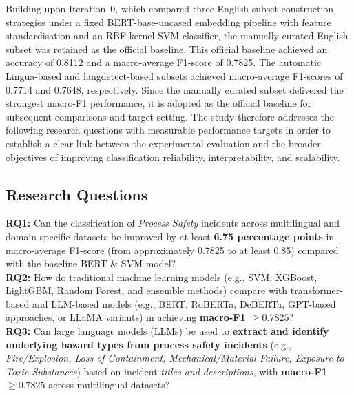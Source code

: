 \documentclass[11pt, titlepage, bibliography=totoc]{scrreprt}
\begin{document}
Building upon Iteration~0, which compared three English subset construction strategies under a fixed BERT-base-uncased embedding pipeline with feature standardisation and an RBF-kernel SVM classifier, the manually curated English subset was retained as the official baseline. This official baseline achieved an accuracy of 0.8112 and a macro-average F1-score of 0.7825. The automatic Lingua-based and langdetect-based subsets achieved macro-average F1-scores of 0.7714 and 0.7648, respectively. Since the manually curated subset delivered the strongest macro-F1 performance, it is adopted as the official baseline for subsequent comparisons and target setting. The study therefore addresses the following research questions with measurable performance targets in order to establish a clear link between the experimental evaluation and the broader objectives of improving classification reliability, interpretability, and scalability.

\subsection{Research Questions}


    \textbf{RQ1:} Can the classification of \textit{Process Safety} incidents across multilingual and domain-specific datasets be improved by at least \textbf{6.75 percentage points} in macro-average F1-score (from approximately 0.7825 to at least 0.85) compared with the baseline BERT \& SVM model?\\

    \textbf{RQ2:} How do traditional machine learning models (e.g., SVM, XGBoost, LightGBM, Random Forest, and ensemble methods) compare with transformer-based and LLM-based models (e.g., BERT, RoBERTa, DeBERTa, GPT-based approaches, or LLaMA variants) in achieving \textbf{macro-F1 $\geq 0.7825$}?\\

    \textbf{RQ3:} Can large language models (LLMs) be used to \textbf{extract and identify underlying hazard types from process safety incidents} (e.g., \textit{Fire/Explosion, Loss of Containment, Mechanical/Material Failure, Exposure to Toxic Substances}) based on incident \textit{titles and descriptions}, with \textbf{macro-F1 $\geq 0.7825$} across multilingual datasets?\\

\end{document}
